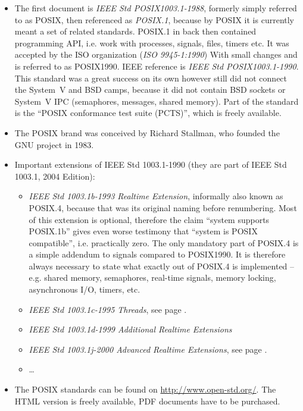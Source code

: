 \begin{itemize}
\item The first document is \emph{IEEE Std POSIX1003.1-1988}, formerly simply
referred to as POSIX, then referenced as \emph{POSIX.1}, because by POSIX it is
currently meant a set of related standards. POSIX.1 in back then contained
programming API, i.e. work with processes, signals, files, timers etc.
It was accepted by the ISO organization (\emph{ISO 9945-1:1990}) With small
changes and is referred to as POSIX1990. IEEE reference is
\emph{IEEE Std POSIX1003.1-1990}. This standard was a great success on its own
however still did not connect the System~V and BSD camps, because it did not
contain BSD sockets or System~V IPC (semaphores, messages, shared memory).
Part of the standard is the ``POSIX conformance test suite (PCTS)'', which is
freely available.
\item The POSIX brand was conceived by Richard Stallman, who founded the GNU
project in 1983.
\item Important extensions of IEEE Std 1003.1-1990 (they are part of IEEE Std
1003.1, 2004 Edition):
\begin{itemize}
\item \emph{IEEE Std 1003.1b-1993 Realtime Extension}, informally also known as
POSIX.4, because that was its original naming before renumbering.  Most of this
extension is optional, therefore the claim ``system supports POSIX.1b'' gives
even worse testimony that ``system is POSIX compatible'', i.e.  practically
zero. The only mandatory part of POSIX.4 is a simple addendum to signals
compared to POSIX1990. It is therefore always necessary to state what exactly
out of POSIX.4 is implemented -- e.g. shared memory, semaphores, real-time
signals, memory locking, asynchronous I/O, timers, etc.
\item \emph{IEEE Std 1003.1c-1995 Threads}, see page \pageref{POSIXTHREADS}.
\item \emph{IEEE Std 1003.1d-1999 Additional Realtime Extensions}
\item \emph{IEEE Std 1003.1j-2000 Advanced Realtime Extensions}, see page
\pageref{RWLOCKS}.
\item \dots
\end{itemize}
\item The POSIX standards can be found on \url{http://www.open-std.org/}.
The HTML version is freely available, PDF documents have to be purchased.
\end{itemize}



